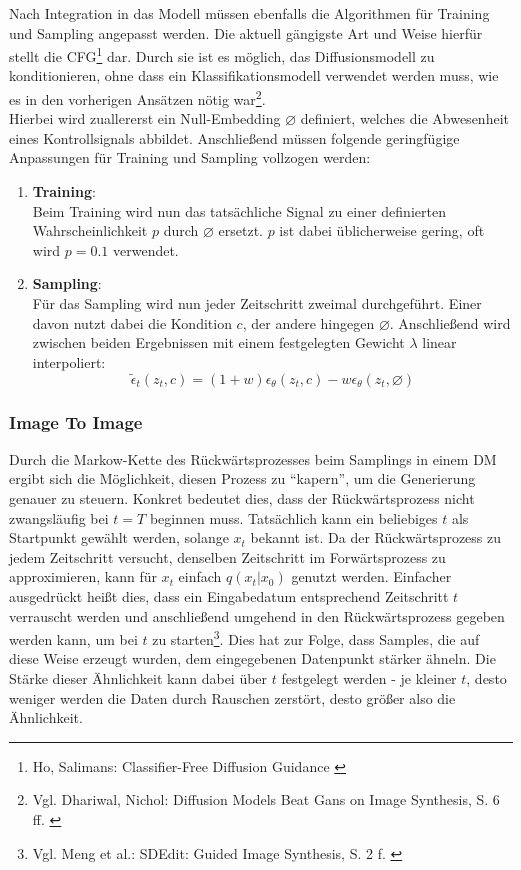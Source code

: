 Nach Integration in das Modell müssen ebenfalls die Algorithmen für Training und Sampling angepasst werden. Die aktuell gängigste Art und Weise hierfür stellt die \ac{CFG}\footnote{
    Ho, Salimans: Classifier-Free Diffusion Guidance
    \cite{ho2022classifierfreediffusionguidance}
} dar. Durch sie ist es möglich, das Diffusionsmodell zu konditionieren, ohne dass ein Klassifikationsmodell verwendet werden muss, wie es in den vorherigen Ansätzen nötig war\footnote{
    Vgl. Dhariwal, Nichol: Diffusion Models Beat Gans on Image Synthesis, S. 6 ff.
    \cite{NEURIPS2021_49ad23d1}
}. \\
Hierbei wird zuallererst ein Null-Embedding $\diameter$ definiert, welches die Abwesenheit eines Kontrollsignals abbildet. Anschließend müssen folgende geringfügige Anpassungen für Training und Sampling vollzogen werden:
\begin{enumerate}
    \item \textbf{Training}:\\
    Beim Training wird nun das tatsächliche Signal zu einer definierten Wahrscheinlichkeit $p$ durch $\diameter$ ersetzt. $p$ ist dabei üblicherweise gering, oft wird $p=0.1$ verwendet.
    \item \textbf{Sampling}:\\
    Für das Sampling wird nun jeder Zeitschritt zweimal durchgeführt. Einer davon nutzt dabei die Kondition $c$, der andere hingegen $\diameter$. Anschließend wird zwischen beiden Ergebnissen mit einem festgelegten Gewicht $\lambda$ linear interpoliert:
    \begin{equation}
        \tilde \epsilon_t(z_t, c) = (1+w)\epsilon_\theta(z_t, c)
        - w\epsilon_\theta(z_t, \diameter)
    \end{equation}
\end{enumerate}

\subsubsection{Image To Image}
\label{subsubsec:i2i}

Durch die Markow-Kette des Rückwärtsprozesses beim Samplings in einem \ac{DM} ergibt sich die Möglichkeit, diesen Prozess zu \enquote{kapern}, um die Generierung genauer zu steuern. Konkret bedeutet dies, dass der Rückwärtsprozess nicht zwangsläufig bei $t=T$ beginnen muss. Tatsächlich kann ein beliebiges $t$ als Startpunkt gewählt werden, solange $x_t$ bekannt ist. Da der Rückwärtsprozess zu jedem Zeitschritt versucht, denselben Zeitschritt im Forwärtsprozess zu approximieren, kann für $x_t$ einfach $q(x_t|x_0)$ genutzt werden. Einfacher ausgedrückt heißt dies, dass ein Eingabedatum entsprechend Zeitschritt $t$ verrauscht werden und anschließend umgehend in den Rückwärtsprozess gegeben werden kann, um bei $t$ zu starten\footnote{
    Vgl. Meng et al.: SDEdit: Guided Image Synthesis, S. 2 f.
    \cite{meng2021sdedit}
}. Dies hat zur Folge, dass Samples, die auf diese Weise erzeugt wurden, dem eingegebenen Datenpunkt stärker ähneln. Die Stärke dieser Ähnlichkeit kann dabei über $t$ festgelegt werden - je kleiner $t$, desto weniger werden die Daten durch Rauschen zerstört, desto größer also die Ähnlichkeit.

